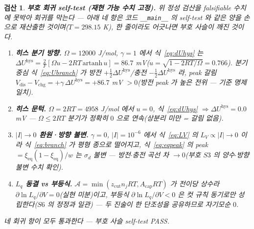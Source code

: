 \documentclass[11pt,a4paper]{article}
\newtheorem*{verifybox}{검산}
\newcommand{\eq}{\mathrm{eq}}
\newcommand{\dis}{\mathrm{dis}}
\newcommand{\chg}{\mathrm{chg}}
\newcommand{\hys}{\mathrm{hys}}
\newcommand{\code}[1]{\texttt{#1}}
\begin{document}
\begin{verifybox}
\textbf{부호 회귀 self-test (재현 가능 수치 고정).} 위 정성 검산을 falsifiable 수치에 못박아 회귀를 막는다 --- 아래
네 항은 코드 \code{\_\_main\_\_} 의 self-test 와 같은 양을 손으로 재산출한 것이며($T=298.15$ K), 한 줄이라도 어긋나면
부호 사슬이 깨진 것이다.
\begin{enumerate}[label=\textbf{R\arabic*.},leftmargin=2.6em,itemsep=1pt]
\item \textbf{히스 분기 방향.} $\Omega=12000$ J/mol, $\gamma=1$ 에서 식~\eqref{eq:dUhys} 는
$\Delta U^\hys=\frac{2}{F}[\Omega u-2RT\,\mathrm{artanh}\,u]=86.7$ mV($u=\sqrt{1-2RT/\Omega}=0.766$). 분기 중심
식~\eqref{eq:Ubranch} 가 방전 $+\tfrac12\Delta U^\hys$/충전 $-\tfrac12\Delta U^\hys$ 라, peak 갈림
$V_\dis-V_\chg=+\gamma\,\Delta U^\hys=+86.7$ mV $>0$(방전 peak 가 높은 전위 --- 기준 명제 일치).
\item \textbf{히스 문턱.} $\Omega=2RT=4958$ J/mol 에서 $u=0$, 식~\eqref{eq:dUhys} $\Rightarrow\Delta U^\hys=0.0$ mV ---
$\Omega\le2RT$ 분기가 정확히 $0$ 으로 연속(상분리 미만 = 갈림 없음).
\item \textbf{$|I|\!\to\!0$ 환원·방향 불변.} $\gamma=0$, $|I|=10^{-6}$ 에서 식~\eqref{eq:LV} 의 $L_V\propto|I|\to0$ 이라
식~\eqref{eq:branch} 가 평형 종으로 떨어지고, 식~\eqref{eq:eqpeak} 의 peak $=\xi_\eq(1-\xi_\eq)/w$ 는 $\sigma_d$ 불변 ---
방전$\cdot$충전 곡선 차 $\to0$(부호 $S3$ 의 양수$\cdot$방향 불변 수치 확인).
\item \textbf{$L_q$ 동결 vs 부등식.} $\mathcal A=\min(z_\mathrm{cut}n_jRT,A_\mathrm{cap}RT)$ 가 전이당 상수라
$\partial\ln L_q/\partial V=0$(실현 미분)이고, 부등식 $\partial\ln L_q/\partial V<0$ 은 컷 규칙 동기로만 성립한다($S6$ 의
정정과 일관) --- 두 진술이 한 단조성을 공유하므로 자기모순 $0$.
\end{enumerate}
네 회귀 항이 모두 통과한다 --- 부호 사슬 self-test PASS.
\end{verifybox}
\end{document}
